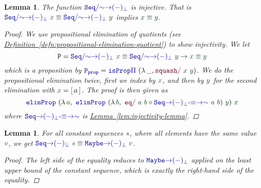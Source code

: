 \documentclass[twoside,11pt,openright]{report}
\theoremstyle{plain} %
\newtheorem{lem}[thm]{Lemma}
\theoremstyle{definition}
\theoremstyle{remark}
\newcommand*{\lemref}[1]{\hyperref[lem:#1]{Lemma~\ref*{lem:#1}}}
\newcommand*{\defref}[1]{\hyperref[defn:#1]{Definition~\ref*{defn:#1}}}
\newcommand*{\term}[1]{\textcolor{green!30!black}{#1}} %
\newcommand*{\function}[1]{\textcolor{blue!60!black}{\ensuremath{\mathtt{#1}}}}
\newcommand*{\constructor}[1]{\textcolor{purple!60!black}{\ensuremath{\mathtt{#1}}}}
\newcommand*{\typeformer}[1]{\ensuremath{\mathtt{#1}}}
\newcommand*{\quotientconstructor}[1]{\constructor{[}\,#1\,\constructor{]}}
\begin{document}
\begin{lem}
  \label{lem:sequence-to-partiality-monad-injectivity}
  The function \(\function{Seq/{\sim}{\rightarrow}(-)_\bot}\) is injective. That is \(\function{Seq/{\sim}{\rightarrow}(-)_\bot}~\term{x} \equiv \function{Seq/{\sim}{\rightarrow}(-)_\bot}~\term{y}\) implies \(\term{x} \equiv \term{y}\).
  \begin{proof}
    We use propositional elimination of quotients (see \defref{propositional-elimination-quotient}) to show injectivity. We let
    \begin{equation}
      \typeformer{P} = \function{Seq/{\sim}{\rightarrow}(-)_\bot}~\term{x} \equiv \function{Seq/{\sim}{\rightarrow}(-)_\bot}~\term{y} \rightarrow \term{x} \equiv \term{y}
    \end{equation}
    which is a proposition by \(\function{P_{prop}} = \function{isProp\text{$\Pi$}}~(\lambda\,\_, \constructor{squash/}~\term{x}~\term{y})\). We do the propositional elimination twice, first we index by \(\term{x}\), and then by \(\term{y}\) for the second elimination with \(\term{x} = \quotientconstructor{a}\). The proof is then given as
    \begin{equation}
      \function{elimProp}~(\lambda\,\term{a},~\function{elimProp}~(\lambda\,\term{b},~\constructor{eq/}~\term{a}~\term{b} \circ \function{Seq{\rightarrow}(-)_\bot\text{-}{\equiv}{\rightarrow}{\sim}}~\term{a}~\term{b})~\term{y})~\term{x}
    \end{equation}
    where \(\function{Seq{\rightarrow}(-)_\bot\text{-}{\equiv}{\rightarrow}{\sim}}\) is \lemref{injectivity-lemma}.
  \end{proof}
\end{lem}
\begin{lem}
  \label{lem:constant-sequence-equality}
  For all constant sequences \(\term{s}\), where all elements have the same value \(\term{v}\), we get \(\function{Seq{\rightarrow}(-)_\bot}~\term{s} \equiv \function{Maybe{\rightarrow}(-)_\bot}~\term{v}\).
  \begin{proof}
    The left side of the equality reduces to \(\function{Maybe{\rightarrow}(-)_\bot}\) applied on the least upper bound of the constant sequence, which is exactly the right-hand side of the equality.
  \end{proof}
\end{lem}
\end{document}
